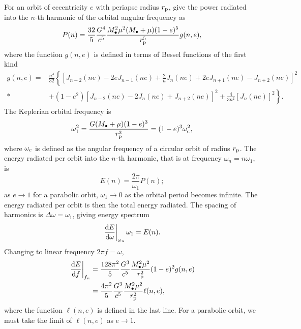 For an orbit of eccentricity $e$ with periapse radius $r_\mathrm{p}$, \citet{Peters1963} give the power radiated into the $n$-th harmonic of the orbital angular frequency as
\begin{equation}
P(n) = \frac{32}{5}\frac{G^4}{c^5}\frac{M_\bullet^2\mu^2(M_\bullet + \mu)(1-e)^5}{r_\mathrm{p}^5}g(n,e),
\label{eq:PM_P}
\end{equation}
where the function $g(n,e)$ is defined in terms of Bessel functions of the first kind
\begin{align}
g(n,e) = {} & \frac{n^4}{32}\left\{\left[J_{n-2}(ne) - 2eJ_{n-1}(ne) + \frac{2}{n}J_n(ne) + 2eJ_{n+1}(ne) - J_{n+2}(ne)\right]^2 \right. \nonumber \\*
 & + \left. \left(1 - e^2\right)\left[J_{n-2}(ne) - 2J_n(ne) + J_{n+2}(ne)\right]^2 + \frac{4}{3n^2}\left[J_n(ne)\right]^2\right\}.
\end{align}
The Keplerian orbital frequency is
\begin{equation}
\omega_1^2 = \frac{G(M_\bullet + \mu)(1 - e)^3}{r_\mathrm{p}^3} = (1 - e)^3\omega_\mathrm{c}^2,
\label{eq:Kepler_freq}
\end{equation}
where $\omega_\mathrm{c}$ is defined as the angular frequency of a circular orbit of radius $r_\mathrm{p}$. The energy radiated per orbit into the $n$-th harmonic, that is at frequency $\omega_n = n\omega_1$, is
\begin{equation}
E(n) = \frac{2\pi}{\omega_1}P(n);
\label{eq:E(n)}
\end{equation}
as $e \rightarrow 1$ for a parabolic orbit, $\omega_1 \rightarrow 0$ as the orbital period becomes infinite. The energy radiated per orbit is then the total energy radiated. The spacing of harmonics is $\Delta\omega = \omega_1$, giving energy spectrum
\begin{equation}
\left.\frac{\mathrm{d} {E}}{\mathrm{d} {\omega}}\right|_{\omega_n}\omega_1 = E(n).
\end{equation}
Changing to linear frequency $2\pi f = \omega$,
\begin{align}
\left.\frac{\mathrm{d} {E}}{\mathrm{d} {f}}\right|_{f_n}  = {} & \frac{128\pi^2}{5}\frac{G^3}{c^5}\frac{M_\bullet^2\mu^2}{r_\mathrm{p}^2}(1-e)^2g(n,e) \\*
  = {} & \frac{4\pi^2}{5}\frac{G^3}{c^5}\frac{M_\bullet^2\mu^2}{r_\mathrm{p}^2}\ell(n,e),
\label{eq:PM_spectrum}
\end{align}
where the function $\ell(n,e)$ is defined in the last line. For a parabolic orbit, we must take the limit of $\ell(n,e)$ as $e \rightarrow 1$.

